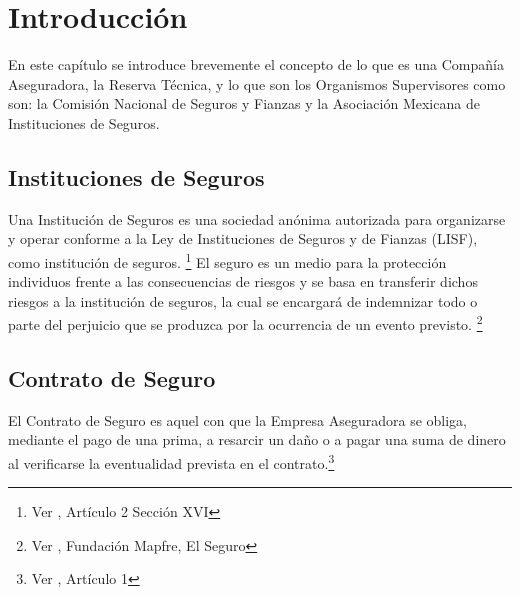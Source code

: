 \documentclass[11pt,twoside,openright,spanish]{report}
\numberwithin{equation}{chapter}
\numberwithin{figure}{chapter}
\numberwithin{table}{chapter}
\renewcommand{\footrulewidth}{0pt}
\renewcommand{\headrulewidth}{0.1pt}
\begin{document}
	
	\fancypagestyle{plain}{
		\fancyhead[L]{}
		\fancyhead[C]{}
		\fancyhead[R]{}
		
		\fancyfoot[L]{}
		\fancyfoot[C]{\thepage}
		\fancyfoot[R]{}
		\renewcommand{\headrulewidth}{0pt}
		\renewcommand{\footrulewidth}{0pt}
	}
	
	\fancyhead[LE]{\scshape\thepage\hspace{1cm}\footnotesize\nouppercase{\leftmark}}
	\fancyhead[LO]{}
	\fancyhead[RE]{}
	\pagestyle{fancy}
	\cleardoublepage
	
	\chapter{Introducción}\label{cap:Introducción}
	\doublespacing
	En este capítulo se introduce brevemente el concepto de lo que es una Compañía Aseguradora, la Reserva Técnica, y lo que son los Organismos Supervisores como son: la Comisión Nacional de Seguros y Fianzas y la Asociación Mexicana de Instituciones de Seguros.
	
	\section{Instituciones de Seguros}
	\doublespacing
	Una Institución de Seguros es una sociedad anónima autorizada para organizarse y operar conforme a la Ley de Instituciones de Seguros y de Fianzas (LISF), como institución de seguros. \footnote{Ver \citet{BAseguradora}, Artículo 2 Sección XVI}
	El seguro es un medio para la protección individuos frente a las consecuencias de riesgos y se basa en transferir dichos riesgos a la institución de seguros, la cual se encargará de indemnizar todo o parte del perjuicio que se produzca por la ocurrencia de un evento previsto. \footnote{Ver \citet{ASeguro}, Fundación Mapfre, El Seguro}
	
	\section{Contrato de Seguro}
	\doublespacing
	El Contrato de Seguro es aquel con que la Empresa Aseguradora se obliga, mediante el pago de una prima, a resarcir un daño o a pagar una suma de dinero al verificarse la eventualidad prevista en el contrato.\footnote{Ver \citet{CContrato}, Artículo 1}
	
\end{document}
